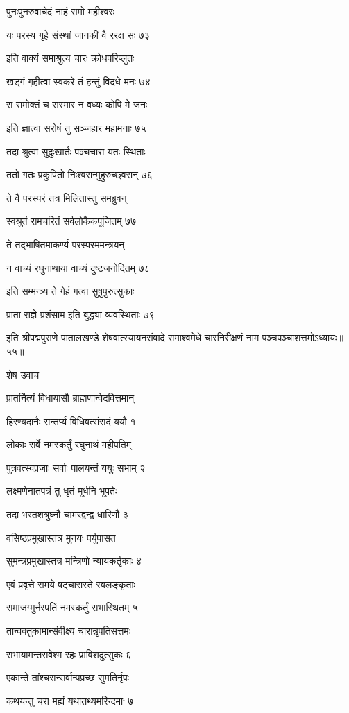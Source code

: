 पुनःपुनरुवाचेदं नाहं रामो महीश्वरः

यः परस्य गृहे संस्थां जानकीं वै ररक्ष सः ७३

इति वाक्यं समाश्रुत्य चारः क्रोधपरिप्लुतः

खड्गं गृहीत्वा स्वकरे तं हन्तुं विदधे मनः ७४

स रामोक्तं च सस्मार न वध्यः कोपि मे जनः

इति ज्ञात्वा सरोषं तु सञ्जहार महामनाः ७५

तदा श्रुत्वा सुदुःखार्तः पञ्चचारा यतः स्थिताः

ततो गतः प्रकुपितो निःश्वसन्मुहुरुच्छ्वसन् ७६

ते वै परस्परं तत्र मिलितास्तु समब्रुवन्

स्वश्रुतं रामचरितं सर्वलोकैकपूजितम् ७७

ते तद्भाषितमाकर्ण्य परस्परममन्त्रयन्

न वाच्यं रघुनाथाया वाच्यं दुष्टजनोदितम् ७८

इति सम्मन्त्र्य ते गेहं गत्वा सुषुपुरुत्सुकाः

प्राता राज्ञे प्रशंसाम इति बुद्ध्या व्यवस्थिताः ७९

इति श्रीपद्मपुराणे पातालखण्डे शेषवात्स्यायनसंवादे रामाश्वमेधे चारनिरीक्षणं नाम पञ्चपञ्चाशत्तमोऽध्यायः॥५५॥


शेष उवाच

प्रातर्नित्यं विधायासौ ब्राह्मणान्वेदवित्तमान्

हिरण्यदानैः सन्तर्प्य विधिवत्संसदं ययौ १

लोकाः सर्वे नमस्कर्तुं रघुनाथं महीपतिम्

पुत्रवत्स्वप्रजाः सर्वाः पालयन्तं ययुः सभाम् २

लक्ष्मणेनातपत्रं तु धृतं मूर्धनि भूपतेः

तदा भरतशत्रुघ्नौ चामरद्वन्द्व धारिणौ ३

वसिष्ठप्रमुखास्तत्र मुनयः पर्युपासत

सुमन्त्रप्रमुखास्तत्र मन्त्रिणो न्यायकर्तृकाः ४

एवं प्रवृत्ते समये षट्चारास्ते स्वलङ्कृताः

समाजग्मुर्नरपतिं नमस्कर्तुं सभास्थितम् ५

तान्वक्तुकामान्संवीक्ष्य चारान्नृपतिसत्तमः

सभायामन्तरावेश्म रहः प्राविशदुत्सुकः ६

एकान्ते तांश्चरान्सर्वान्पप्रच्छ सुमतिर्नृपः

कथयन्तु चरा मह्यं यथातथ्यमरिन्दमाः ७


